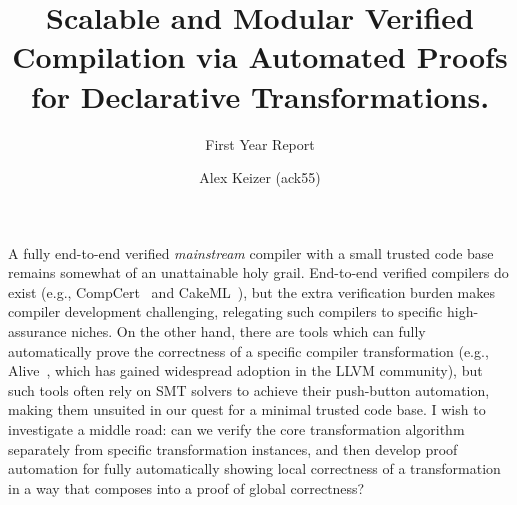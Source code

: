 \documentclass[a4paper]{scrartcl}
\begin{document}
\title{Scalable and Modular Verified Compilation via Automated Proofs
for Declarative
Transformations.}                                      
\subtitle{First Year Report}

\author{Alex Keizer \small{(ack55)}}
\date{}



\maketitle

A fully end-to-end verified \emph{mainstream} compiler with a small
trusted code base remains somewhat of an unattainable holy grail.
End-to-end verified compilers do exist (e.g., CompCert~\cite{leroyCompCertFormallyVerified} and CakeML~\cite{kumarCakeMLVerifiedImplementation2014}), but the extra
verification burden makes compiler development challenging, relegating
such compilers to specific high-assurance niches. On the other hand,
there are tools which can fully automatically prove the correctness of a
specific compiler transformation (e.g., Alive~\cite{lopesAlive2BoundedTranslation2021}, which has gained
widespread adoption in the LLVM community), but such tools
often rely on SMT solvers to achieve their push-button automation,
making them unsuited in our quest for a minimal trusted code base. I
wish to investigate a middle road: can we verify the core transformation
algorithm separately from specific transformation instances, and then
develop proof automation for fully automatically showing local
correctness of a transformation in a way that composes into a proof of
global correctness?
\end{document}
